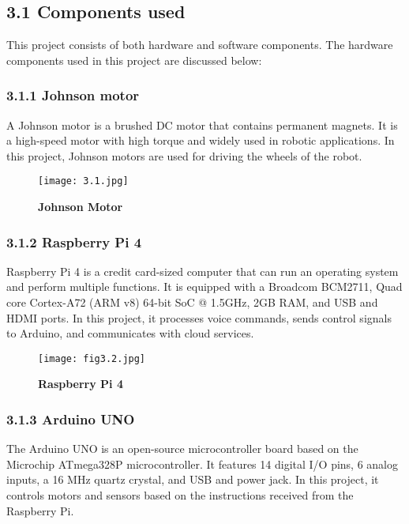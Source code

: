 \subsection*{3.1 Components used}

This project consists of both hardware and software components. The hardware components used in this project are discussed below:

\subsubsection*{3.1.1 Johnson motor}

A Johnson motor is a brushed DC motor that contains permanent magnets. It is a high-speed motor with high torque and widely used in robotic applications. In this project, Johnson motors are used for driving the wheels of the robot.

\begin{figure}[H]
    \centering
    \texttt{[image: 3.1.jpg]}
    \caption{\textbf{Johnson Motor}}
    \label{fig:3.1}
\end{figure}

\subsubsection*{3.1.2 Raspberry Pi 4}

Raspberry Pi 4 is a credit card-sized computer that can run an operating system and perform multiple functions. It is equipped with a Broadcom BCM2711, Quad core Cortex-A72 (ARM v8) 64-bit SoC @ 1.5GHz, 2GB RAM, and USB and HDMI ports. In this project, it processes voice commands, sends control signals to Arduino, and communicates with cloud services.

\begin{figure}[H]
    \centering
    \texttt{[image: fig3.2.jpg]}
    \caption{\textbf{Raspberry Pi 4}}
    \label{fig:3.2}
\end{figure}

\subsubsection*{3.1.3 Arduino UNO}

The Arduino UNO is an open-source microcontroller board based on the Microchip ATmega328P microcontroller. It features 14 digital I/O pins, 6 analog inputs, a 16 MHz quartz crystal, and USB and power jack. In this project, it controls motors and sensors based on the instructions received from the Raspberry Pi.

